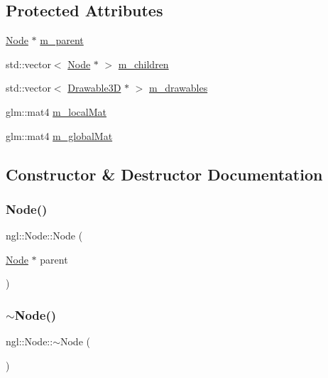 \subsection*{Protected Attributes}
\begin{DoxyCompactItemize}
\item 
\mbox{\hyperlink{classngl_1_1_node}{Node}} $\ast$ \mbox{\hyperlink{classngl_1_1_node_aee782f1aa45eaee442daa72f76fbc6e5}{m\+\_\+parent}}
\item 
std\+::vector$<$ \mbox{\hyperlink{classngl_1_1_node}{Node}} $\ast$ $>$ \mbox{\hyperlink{classngl_1_1_node_a98942fa461ca73fe95e4d529537d8ea9}{m\+\_\+children}}
\item 
std\+::vector$<$ \mbox{\hyperlink{classngl_1_1_drawable3_d}{Drawable3D}} $\ast$ $>$ \mbox{\hyperlink{classngl_1_1_node_a1948b5a764cd36d8f115fcc077814b6b}{m\+\_\+drawables}}
\item 
glm\+::mat4 \mbox{\hyperlink{classngl_1_1_node_afdcf6f45ededa5e77975fb416f7b77d8}{m\+\_\+local\+Mat}}
\item 
glm\+::mat4 \mbox{\hyperlink{classngl_1_1_node_a2af91cacc6dc2651ef9881c51c71e819}{m\+\_\+global\+Mat}}
\end{DoxyCompactItemize}


\subsection{Constructor \& Destructor Documentation}
\mbox{\label{classngl_1_1_node_a6180056dc1d679998c296705a682d99d}} 
\subsubsection{\texorpdfstring{Node()}{Node()}}
{\footnotesize\ttfamily ngl\+::\+Node\+::\+Node (\begin{DoxyParamCaption}\item[{\mbox{\hyperlink{classngl_1_1_node}{Node}} $\ast$}]{parent }\end{DoxyParamCaption})\hspace{0.3cm}{\ttfamily [explicit]}}

\mbox{\label{classngl_1_1_node_ab44ee89879e42f793401c3044caf2847}} 
\subsubsection{\texorpdfstring{$\sim$\+Node()}{~Node()}}
{\footnotesize\ttfamily ngl\+::\+Node\+::$\sim$\+Node (\begin{DoxyParamCaption}{ }\end{DoxyParamCaption})\hspace{0.3cm}{\ttfamily [virtual]}}



